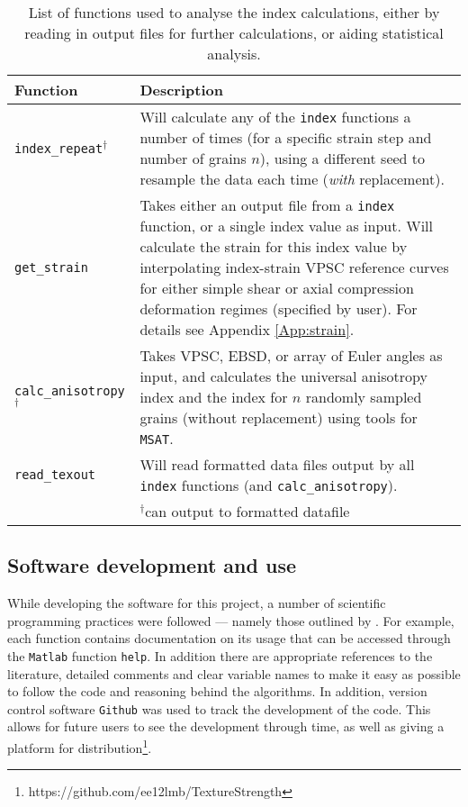 \documentclass[a4paper,12pt,twoside]{report}
\numberwithin{equation}{chapter}
\begin{document}
\begin{table}[h!] 
	\centering
	\caption[Functions: analysis]{List of functions used to analyse the index calculations, either by reading in output files for further calculations, or aiding statistical analysis.}
	\noindent
	
\begin{tabularx}{\textwidth}{lX}

\hline
\hline
Function    & Description   \\ 
\hline
\hline
\texttt{index\_{}repeat}$^{\dagger}$ & Will calculate any of the \texttt{index} functions a number of times (for a specific strain step and number of grains $n$), using a different seed to resample the data each time (\emph{with} replacement). \\

\texttt{get\_{}strain} & Takes either an output file from a \texttt{index} function, or a single index value as input. Will calculate the strain for this index value by interpolating index-strain VPSC reference curves for either simple shear or axial compression deformation regimes (specified by user). For details see Appendix \ref{App:strain}. \\

\texttt{calc\_{}anisotropy}$^\dagger$ & Takes VPSC, EBSD, or array of Euler angles as input, and calculates the universal anisotropy index and the \cite{Ledbetter2006} index for $n$ randomly sampled grains (without replacement) using tools for \texttt{MSAT}. \\

\texttt{read\_{}texout} & Will read formatted data files output by all \texttt{index} functions (and \texttt{calc\_{}anisotropy}). \\
\hline
{} & $^\dagger$can output to formatted datafile \\
\hline
\hline
\end{tabularx}
\label{tab:analysis_functions}
\end{table}

\subsection{Software development and use}

While developing the software for this project, a number of scientific programming practices were followed --- namely those outlined by \cite{Wilson2014}. For example, each function contains documentation on its usage that can be accessed through the \texttt{Matlab} function \texttt{help}. In addition there are appropriate references to the literature, detailed comments and clear variable names to make it easy as possible to follow the code and reasoning behind the algorithms. In addition, version control software \texttt{Github} was used to track the development of the code. This allows for future users to see the development through time, as well as giving a platform for distribution\footnote{https://github.com/ee12lmb/TextureStrength}.
\end{document}
